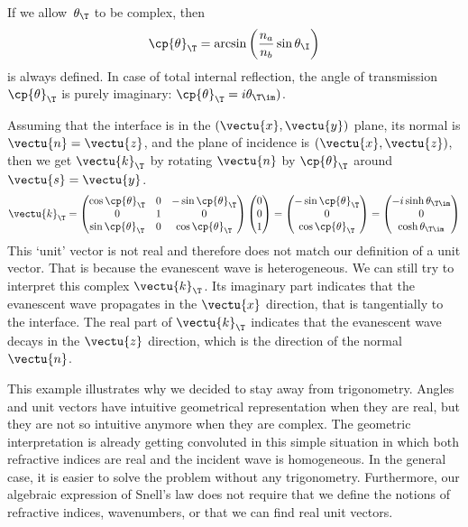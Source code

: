 If we allow~$\theta_\T$ to be complex, then
\begin{equation}
    \cp{\theta}_\T = \arcsin
    \left(
        \frac{n_a}{n_b} \sin \theta_\I
    \right)
\end{equation}
is always defined.
In case of total internal reflection, the angle of transmission~$\cp{\theta}_\T$ is purely imaginary: $\cp{\theta}_\T = i \theta_{\T \im})$.

Assuming that the interface is in the $(\vectu{x}, \vectu{y})$ plane, its normal is $\vectu{n}=\vectu{z}$, and the plane of incidence is $(\vectu{x}, \vectu{z})$, then we get $\vectu{k}_\T$ by rotating $\vectu{n}$ by $\cp{\theta}_\T$ around $\vectu{s}=\vectu{y}$.
\begin{equation}
    \vectu{k}_\T =
    \begin{pmatrix}
        \cos \cp{\theta}_\T   & 0 & -\sin \cp{\theta}_\T \\
        0 & 1 & 0\\
        \sin \cp{\theta}_\T   & 0 & \cos \cp{\theta}_\T \\
    \end{pmatrix}
    \begin{pmatrix}
        0 \\ 0 \\ 1
    \end{pmatrix}
    =
    \begin{pmatrix}
        -\sin \cp{\theta}_\T \\ 0 \\ \cos \cp{\theta}_\T
    \end{pmatrix}
    =
    \begin{pmatrix}
        -i \sinh \theta_{\T \im} \\ 0 \\ \cosh \theta_{\T \im}
    \end{pmatrix}
\end{equation}
This `unit' vector is not real and therefore does not match our definition of a unit vector.
That is because the evanescent wave is heterogeneous.
We can still try to interpret this complex $\vectu{k}_\T$.
Its imaginary part indicates that the evanescent wave propagates in the $\vectu{x}$ direction, that is tangentially to the interface.
The real part of $\vectu{k}_\T$ indicates that the evanescent wave decays in the $\vectu{z}$ direction, which is the direction of the normal $\vectu{n}$.

This example illustrates why we decided to stay away from trigonometry.
Angles and unit vectors have intuitive geometrical representation when they are real, but they are not so intuitive anymore when they are complex.
The geometric interpretation is already getting convoluted in this simple situation in which both refractive indices are real and the incident wave is homogeneous.
In the general case, it is easier to solve the problem without any trigonometry.
Furthermore, our algebraic expression of Snell's law does not require that we define the notions of refractive indices, wavenumbers, or that we can find real unit vectors.

